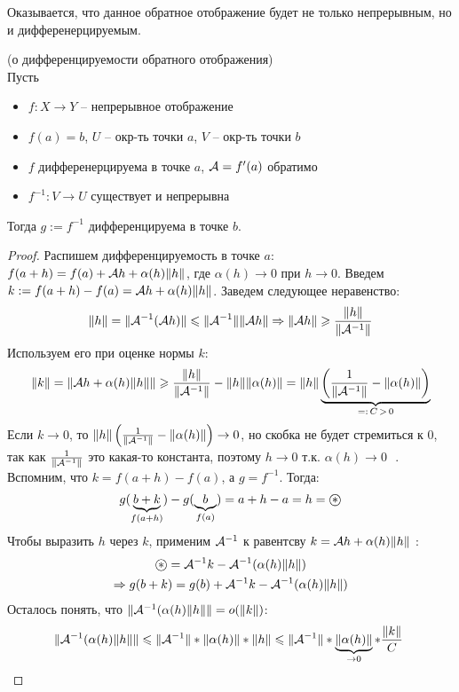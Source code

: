 Оказывается, что данное обратное отображение будет не только непрерывным, но и дифференерцируемым.
\begin{theorem} (о дифференцируемости обратного отображения) \\
    Пусть \begin{itemize}
        \item $f: X \to Y$  -- непрерывное отображение
        \item $f(a) = b$, $U$ -- окр-ть точки $a$, $V$ -- окр-ть точки $b$
        \item $f$ дифференерцируема в точке $a$, $\mathcal{A} = f'(a)$ обратимо
        \item $f^{-1}: V \to U$ существует и непрерывна
    \end{itemize}
    Тогда $g := f^{-1}$ дифференцируема в точке $b$.
\end{theorem}
\begin{proof}
    Распишем дифференцируемость в точке $a$: $f(a + h) = f(a) + \mathcal{A} h + \alpha(h)\| h \|$, где $\alpha(h) \to 0$ при $h \to 0$.
    Введем $k := f(a + h) - f(a) = \mathcal{A} h + \alpha(h)\| h \|$. 
    Заведем следующее неравенство: \[ \| h \| = \| \mathcal{A}^{-1}(\mathcal{A} h) \| \leqslant \| \mathcal{A}^{-1} \| \| \mathcal{A} h \| \Rightarrow \| \mathcal{A} h \| \geqslant \frac{\| h \|}{\| \mathcal{A}^{-1} \|} \]
    \quad Используем его при оценке нормы $k$: \[ \| k \| = \| \mathcal{A} h + \alpha(h)\| h \| \| \geqslant \frac{\| h \|}{\| \mathcal{A}^{-1} \|} - \| h \|\|\alpha(h) \| = \| h \| \underbrace{\left(\frac{1}{\| \mathcal{A}^{-1} \|} - \| \alpha(h) \| \right)}_{=:\, C \, > \, 0} \]
    \quad Если $k \to 0$, то $\| h \| \left(\frac{1}{\| \mathcal{A}^{-1} \|} - \| \alpha(h) \| \right) \to 0$, но скобка не будет стремиться к 0, так как $\frac{1}{\| \mathcal{A}^{-1} \|}$ это какая-то константа, поэтому $h \to 0 \text{ т.к. $\alpha(h) \to 0$ }$.
    Вспомним, что $k = f(a+h) - f(a)$, а $g = f^{-1}$. 
    \quad Тогда: \begin{gather*}
        g(\underbrace{b + k}_{f(a+h)}) - g(\underbrace{b}_{f(a)}) = a + h - a = h = \oast 
    \end{gather*}
    \quad Чтобы выразить $h$ через $k$, применим $\mathcal{A}^{-1}$ к равентсву $k = \mathcal{A} h + \alpha(h)\| h \|$ : \begin{gather*}
        \oast = \A^{-1}k - \A^{-1}(\alpha(h) \| h \|) \\
        \Rightarrow g(b + k) = g(b) + \A^{-1}k - \A^{-1}(\alpha(h) \| h \|)
    \end{gather*}
    \quad Осталось понять, что $\| \mathcal{A}^{-1}(\alpha(h) \| h \| \| = o(\|k\|)$:
    \[ \| \mathcal{A}^{-1}(\alpha(h) \| h \| \| \leqslant \| \mathcal{A}^{-1} \| * \|\alpha(h) \| * \| h \| \leqslant \| \mathcal{A}^{-1} \| * \underbrace{\|\alpha(h) \|}_{\to 0} * \frac{\|k\|}{C}\  \]
\end{proof}

